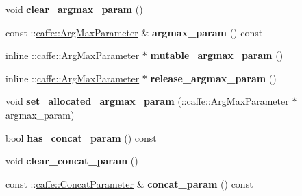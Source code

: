 \begin{DoxyCompactItemize}
\mbox{\label{classcaffe_1_1_v1_layer_parameter_a48cb90d07126bdc999b8f84f140d63d2}} 
void {\bfseries clear\+\_\+argmax\+\_\+param} ()
\item 
\mbox{\label{classcaffe_1_1_v1_layer_parameter_a36479646ea5d925e6424e7df72398ee0}} 
const \+::\mbox{\hyperlink{classcaffe_1_1_arg_max_parameter}{caffe\+::\+Arg\+Max\+Parameter}} \& {\bfseries argmax\+\_\+param} () const
\item 
\mbox{\label{classcaffe_1_1_v1_layer_parameter_a9797e3bba54fed2b8c924578625f9bb8}} 
inline \+::\mbox{\hyperlink{classcaffe_1_1_arg_max_parameter}{caffe\+::\+Arg\+Max\+Parameter}} $\ast$ {\bfseries mutable\+\_\+argmax\+\_\+param} ()
\item 
\mbox{\label{classcaffe_1_1_v1_layer_parameter_a7d839ebc820fb23e7995dd1caacc20f7}} 
inline \+::\mbox{\hyperlink{classcaffe_1_1_arg_max_parameter}{caffe\+::\+Arg\+Max\+Parameter}} $\ast$ {\bfseries release\+\_\+argmax\+\_\+param} ()
\item 
\mbox{\label{classcaffe_1_1_v1_layer_parameter_a31404ab6c62bb45844cc0d85655d8968}} 
void {\bfseries set\+\_\+allocated\+\_\+argmax\+\_\+param} (\+::\mbox{\hyperlink{classcaffe_1_1_arg_max_parameter}{caffe\+::\+Arg\+Max\+Parameter}} $\ast$argmax\+\_\+param)
\item 
\mbox{\label{classcaffe_1_1_v1_layer_parameter_a34f8f08369ad468805649fd80bc39796}} 
bool {\bfseries has\+\_\+concat\+\_\+param} () const
\item 
\mbox{\label{classcaffe_1_1_v1_layer_parameter_a3e58977519da8bf66b91027c45824503}} 
void {\bfseries clear\+\_\+concat\+\_\+param} ()
\item 
\mbox{\label{classcaffe_1_1_v1_layer_parameter_a379b7fa75aad77f1a22f87d1f873cdc6}} 
const \+::\mbox{\hyperlink{classcaffe_1_1_concat_parameter}{caffe\+::\+Concat\+Parameter}} \& {\bfseries concat\+\_\+param} () const
\item 
\mbox{\label{classcaffe_1_1_v1_layer_parameter_a0b678240d7b6978260cd506f9e5f04f3}} 

\end{DoxyCompactItemize}
